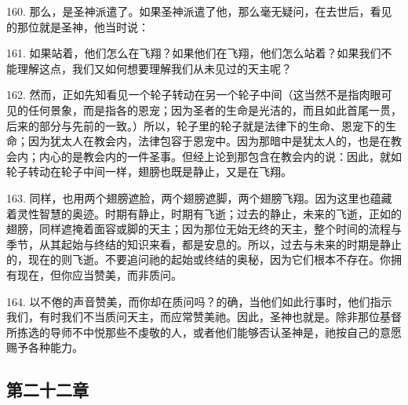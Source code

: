 160. 那么，是圣神派遣了。如果圣神派遣了他，那么毫无疑问，在去世后，看见的那位就是圣神，他当时说：\par

161. 如果站着，他们怎么在飞翔？如果他们在飞翔，他们怎么站着？如果我们不能理解这点，我们又如何想要理解我们从未见过的天主呢？\par

162. 然而，正如先知看见一个轮子转动在另一个轮子中间（这当然不是指肉眼可见的任何景象，而是指各的恩宠；因为圣者的生命是光洁的，而且如此首尾一贯，后来的部分与先前的一致。）所以，轮子里的轮子就是法律下的生命、恩宠下的生命；因为犹太人在教会内，法律包容于恩宠中。因为那暗中是犹太人的，也是在教会内；内心的是教会内的一件圣事。但经上论到那包含在教会内的说：因此，就如轮子转动在轮子中间一样，翅膀也既是静止，又是在飞翔。\par

163. 同样，也用两个翅膀遮脸，两个翅膀遮脚，两个翅膀飞翔。因为这里也蕴藏着灵性智慧的奥迹。时期有静止，时期有飞逝；过去的静止，未来的飞逝，正如的翅膀，同样遮掩着面容或脚的天主；因为那位无始无终的天主，整个时间的流程与季节，从其起始与终结的知识来看，都是安息的。所以，过去与未来的时期是静止的，现在的则飞逝。不要追问祂的起始或终结的奥秘，因为它们根本不存在。你拥有现在，但你应当赞美，而非质问。\par

164. 以不倦的声音赞美，而你却在质问吗？的确，当他们如此行事时，他们指示我们，有时我们不当质问天主，而应常赞美祂。因此，圣神也就是。除非那位基督所拣选的导师不中悦那些不虔敬的人，或者他们能够否认圣神是，祂按自己的意愿赐予各种能力。\par


\subsection{第二十二章}

